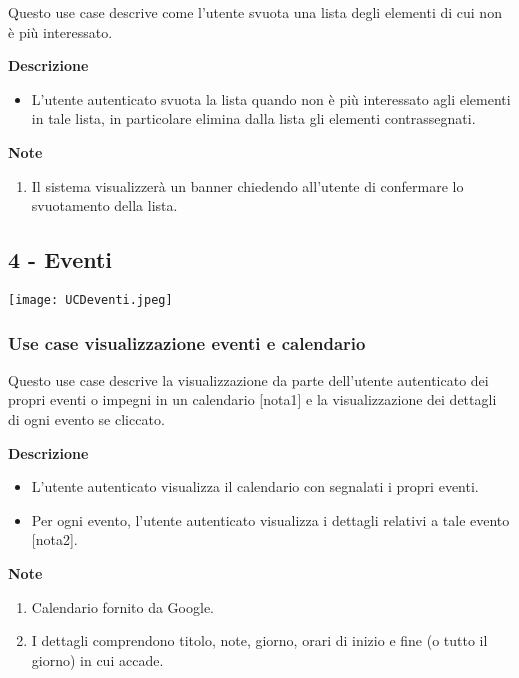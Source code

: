 \documentclass[a4paper,12pt]{article}
\begin{document}
Questo use case descrive come l'utente svuota una lista degli elementi di cui non è più interessato.

\textbf{Descrizione}
\begin{itemize} \setlength\itemsep{0.01em}
\item L'utente autenticato svuota la lista quando non è più interessato agli elementi in tale lista, in particolare elimina dalla lista gli elementi contrassegnati.
\end{itemize}

\textbf{Note}
\begin{enumerate} \setlength\itemsep{0.01em}
\item Il sistema visualizzerà un banner chiedendo all'utente di confermare lo svuotamento della lista.
\end{enumerate}







\subsection*{4 - Eventi }

\begin{center}
  \texttt{[image: UCDeventi.jpeg]}
\end{center}
\subsubsection*{Use case visualizzazione eventi e calendario}

Questo use case descrive la visualizzazione da parte dell'utente autenticato dei propri eventi o impegni in un calendario [nota1] e la visualizzazione dei dettagli di ogni evento se cliccato.

\textbf{Descrizione}
\begin{itemize} \setlength\itemsep{0.01em}
\item L'utente autenticato visualizza il calendario con segnalati i propri eventi.
\item Per ogni evento, l'utente autenticato visualizza i dettagli relativi a tale evento [nota2].
\end{itemize}

\textbf{Note}
\begin{enumerate} \setlength\itemsep{0.01em}
\item Calendario fornito da Google.
\item I dettagli comprendono titolo, note, giorno, orari di inizio e fine (o tutto il giorno) in cui accade.
\end{enumerate}
\end{document}
